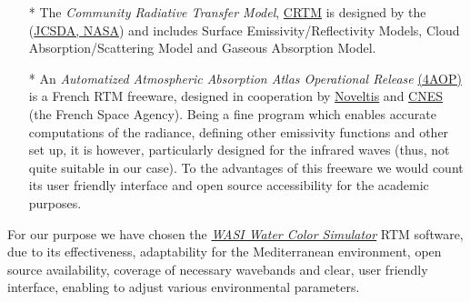 \documentclass[10pt, a4paper]{article}
\begin{document}
\begin{itemize}
		\item [*] The \textit{Community Radiative Transfer Model}, \href{http://www.jcsda.noaa.gov/projects_crtm.php}{CRTM} is designed by the  (\href{http://www.jcsda.noaa.gov/}{JCSDA, NASA}) and includes Surface Emissivity/Reflectivity Models, Cloud Absorption/Scattering Model and Gaseous Absorption Model.
		\item [*] An \textit{Automatized Atmospheric Absorption Atlas Operational Release} \href{http://www.noveltis.fr/4AOP/}{(4AOP)} is a French RTM freeware, designed in cooperation by \href{http://www.noveltis.fr/fr/index.php}{Noveltis} and \href{http://www.cnes.fr/}{CNES} (the French Space Agency). Being a fine program which enables accurate computations of the radiance, defining other emissivity functions and other set up, it is however, particularly designed for the infrared waves (thus, not quite suitable in our case). To the advantages of this freeware we would count its user friendly interface and open source accessibility for the academic purposes. 
	\end{itemize}
For our purpose we have chosen the \href{http://www.filewatcher.com/b/ftp/ftp.dfd.dlr.de/pub/WASI.0.0.html}{\textit{WASI Water Color Simulator}} RTM software, due to its effectiveness, adaptability for the Mediterranean environment, open source availability, coverage of necessary wavebands and clear, user friendly interface, enabling to adjust various environmental parameters.
\end{document}
